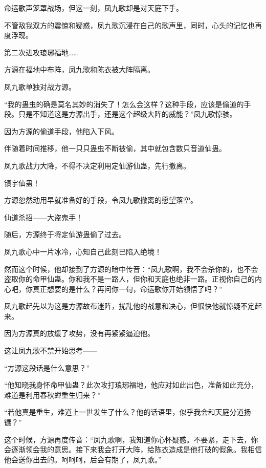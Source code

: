 
\begin{this_body}



命运歌声笼罩战场，但这一刻，凤九歌却是对天庭下手。

不管敌我双方的震惊和疑惑，凤九歌沉浸在自己的歌声里，同时，心头的记忆也再度浮现。

第二次进攻琅琊福地……

方源在福地中布阵，凤九歌和陈衣被大阵隔离。

凤九歌单独对战方源。

“我的蛊虫的确是莫名其妙的消失了！怎么会这样？这种手段，应该是偷道的手段。只是不知道这是方源出手，还是这个超级大阵的威能？”凤九歌惊骇。

因为方源的偷道手段，他陷入下风。

伴随着时间推移，他一只只蛊虫不断被偷，其中就包含数只音道仙蛊。

凤九歌战力大降，不得不决定利用定仙游仙蛊，先行撤离。

镇宇仙蛊！

方源忽然动用早就准备好的手段，令凤九歌撤离的愿望落空。

仙道杀招——大盗鬼手！

随后，方源终于将定仙游蛊偷了过去。

凤九歌心中一片冰冷，心知自己此刻已陷入绝境！

然而这个时候，他却接到了方源的暗中传音：“凤九歌啊，我不会杀你的，也不会盗取你的命甲仙蛊。你和我不是一路人，但你和天庭也绝非一路。正视你自己的内心吧，你真正想要的是什么？再问你一句，命运歌你开始领悟了吗？”

凤九歌起先以为这是方源故布迷阵，扰乱他的战意和决心，但很快他就惊疑不定起来。

因为方源真的放缓了攻势，没有再紧紧逼迫他。

这让凤九歌不禁开始思考——

“方源这段话是什么意思？”

“他知晓我身怀命甲仙蛊？此次攻打琅琊福地，他应对如此出色，准备如此充分，难道是利用春秋蝉重生归来？”

“若他真是重生，难道上一世发生了什么？他的话语里，似乎我会和天庭分道扬镳？”

这个时候，方源再度传音：“凤九歌啊，我知道你心怀疑惑。不要紧，走下去，你会逐渐领会我的意思。接下来我会打开大阵，给陈衣造成是他打破的假象。我相信他会送你出去的。呵呵呵，后会有期了，凤九歌。”


\end{this_body}
